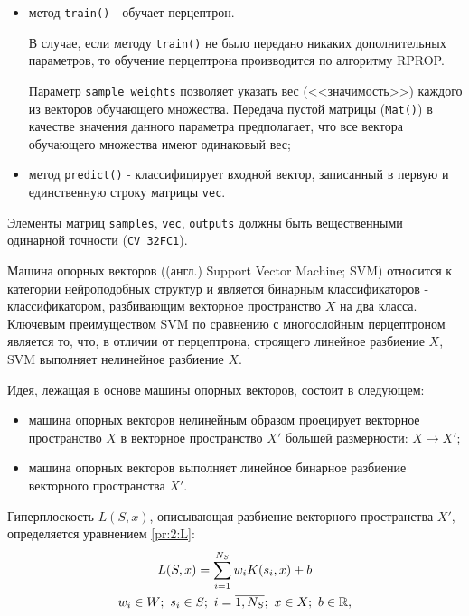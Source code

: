 \begin{itemize}
	\item метод \verb|train()| - обучает перцептрон.

	В случае, если методу \verb|train()| не было передано никаких дополнительных параметров, то обучение перцептрона производится по алгоритму RPROP.

	Параметр \verb|sample_weights| позволяет указать вес (<<значимость>>) каждого из векторов обучающего множества. Передача пустой матрицы (\verb|Mat()|) в качестве значения данного параметра предполагает, что все вектора обучающего множества имеют одинаковый вес;

	\item метод \verb|predict()| - классифицирует входной вектор, записанный в первую и единственную строку матрицы \verb|vec|.

\end{itemize}

Элементы матриц \verb|samples|, \verb|vec|, \verb|outputs| должны быть вещественными одинарной точности (\verb|CV_32FC1|).


Машина опорных векторов ((англ.) Support Vector Machine; SVM) относится к категории нейроподобных структур и является бинарным классификаторов - классификатором, разбивающим векторное пространство $X$ на два класса. Ключевым преимуществом SVM по сравнению с многослойным перцептроном является то, что, в отличии от перцептрона, строящего линейное разбиение $X$, SVM выполняет нелинейное разбиение $X$.

Идея, лежащая в основе машины опорных векторов, состоит в следующем:

\begin{itemize}

	\item машина опорных векторов нелинейным образом проецирует векторное пространство $X$ в векторное пространство $X'$ большей размерности: $X \to X'$;
	\item машина опорных векторов выполняет линейное бинарное разбиение векторного пространства $X'$.

\end{itemize}

Гиперплоскость $L(S, x)$, описывающая разбиение векторного пространства $X'$, определяется уравнением \eqref{pr:2:L}:
\begin{gather}
	L(S, x) = \sum_{i = 1}^{N_S} w_i K(s_i, x) + b \label{pr:2:L} \\
	w_i \in W ;~ s_i \in S ;~ i = \overline{1, N_S} ;~ x \in X ;~ b \in \mathbb{R} \notag,
\end{gather}

